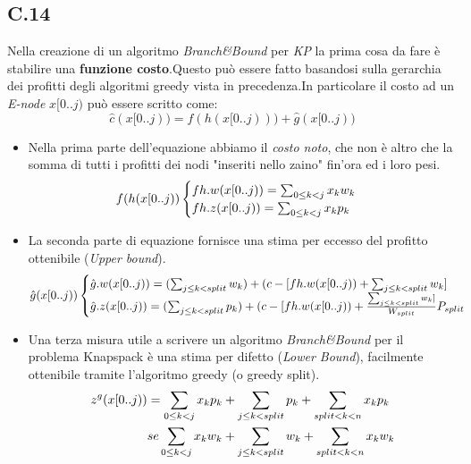 \documentclass[a4paper]{article}
\begin{document}
\subsection{C.14}
Nella creazione di un algoritmo \textit{Branch\&Bound} per \emph{KP} la prima cosa da fare è stabilire una \textbf{funzione costo}.Questo può essere fatto basandosi sulla gerarchia dei profitti degli algoritmi greedy vista in precedenza.In particolare il costo ad un \textit{E-node} $x[0..j)$ può essere scritto come:
$$\hat{c}(x[0..j)) = f(h(x[0..j))) + \hat{g}(x[0..j))$$
\begin{itemize}
	\item Nella prima parte dell'equazione abbiamo il \textit{costo noto}, che non è altro che la somma di tutti i profitti dei nodi "inseriti nello zaino" fin'ora ed i loro pesi. 
		\begin{equation}
                	f(h(x[0..j))\begin{cases}
			fh.w(x[0..j))= \sum_{0\leq k < j} x_{k}w_{k}\\
			fh.z(x[0..j))= \sum_{0\leq k < j} x_{k}p_{k}\notag
                \end{cases}
	        \end{equation}
	\item La seconda parte di equazione fornisce una stima per eccesso del profitto ottenibile (\textit{Upper bound}).
		\begin{equation}
			\hat{g}(x[0..j))\begin{cases}
				\hat{g}.w(x[0..j))= (\sum_{j\leq k < split} w_{k})+(c-[fh.w(x[0..j)) + \sum_{j\leq k < split} w_{k}]\\
				\hat{g}.z(x[0..j))= (\sum_{j\leq k < split} p_{k})+(c-[fh.w(x[0..j)) + \frac{\sum_{j\leq k < split} w_{k}]}{W_{split}}P_{split} \notag
                	\end{cases}
	        \end{equation}
	\item Una terza misura utile a scrivere un algoritmo \textit{Branch\&Bound} per il problema Knapspack è una stima per difetto (\textit{Lower Bound}), facilmente ottenibile tramite l'algoritmo greedy (o greedy split).
		\begin{align}
				z^g(x[0..j)) &= \sum_{0\leq k < j} x_{k}p_{k} + \sum_{j\leq k < split} p_{k} + \sum_{split < k < n} x_{k}p_{k} \notag \\
			&se \sum_{0\leq k < j} x_{k}w_{k} + \sum_{j\leq k < split} w_{k} + \sum_{split < k < n} x_{k}w_{k}\notag
		\end{align}
\end{itemize}
\end{document}
